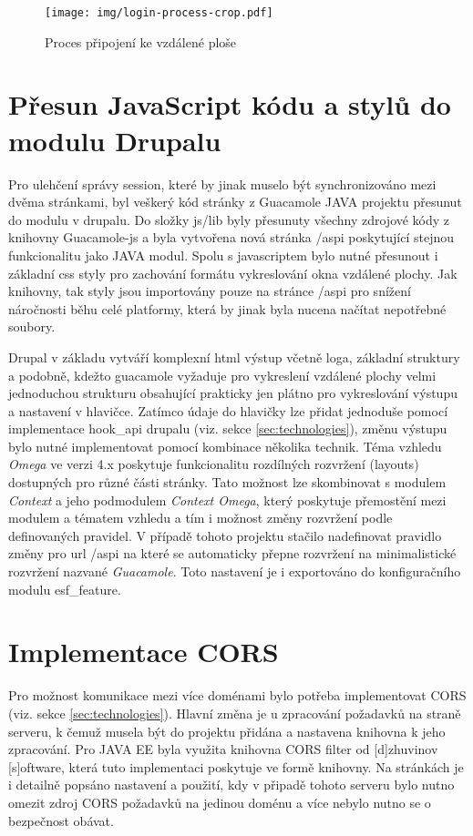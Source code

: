 \begin{figure}[]
  \texttt{[image: img/login-process-crop.pdf]}
  \caption{Proces připojení ke vzdálené ploše}
  \label{fig:login_process}
\end{figure}  

\section{Přesun JavaScript kódu a stylů do modulu Drupalu}
Pro ulehčení správy \gls{session}, které by jinak muselo být synchronizováno mezi dvěma stránkami, byl veškerý kód stránky z Guacamole JAVA projektu přesunut do modulu v drupalu. Do složky js/lib byly přesunuty všechny zdrojové kódy z knihovny Guacamole-js a byla vytvořena nová stránka /aspi poskytující stejnou funkcionalitu jako JAVA modul. Spolu s javascriptem bylo nutné přesunout i základní css styly pro zachování formátu vykreslování okna vzdálené plochy. Jak knihovny, tak styly jsou importovány pouze na stránce /aspi pro snížení náročnosti běhu celé platformy, která by jinak byla nucena načítat nepotřebné soubory. 

Drupal v základu vytváří komplexní html výstup včetně loga, základní struktury a podobně, kdežto guacamole vyžaduje pro vykreslení vzdálené plochy velmi jednoduchou strukturu obsahující prakticky jen plátno pro vykreslování výstupu a nastavení v hlavičce. Zatímco údaje do hlavičky lze přidat jednoduše pomocí implementace hook\_api drupalu (viz. sekce \ref{sec:technologies}), změnu výstupu bylo nutné implementovat pomocí kombinace několika technik. Téma vzhledu \emph{Omega} ve verzi 4.x poskytuje funkcionalitu rozdílných rozvržení (layouts) dostupných pro různé části stránky. Tato možnost lze skombinovat s modulem \emph{Context} a jeho podmodulem \emph{Context Omega}, který poskytuje přemostění mezi modulem a tématem vzhledu a tím i možnost změny rozvržení podle definovaných pravidel. V případě tohoto projektu stačilo nadefinovat pravidlo změny pro url /aspi na které se automaticky přepne rozvržení na minimalistické rozvržení nazvané \emph{Guacamole}. Toto nastavení je i exportováno do konfiguračního modulu esf\_feature.

\section{Implementace CORS}
Pro možnost komunikace mezi více doménami bylo potřeba implementovat CORS (viz. sekce \ref{sec:technologies}). Hlavní změna je u zpracování požadavků na straně serveru, k čemuž musela být do projektu přidána a nastavena knihovna k jeho zpracování. Pro JAVA EE byla využita knihovna CORS filter od [d]zhuvinov  [s]oftware\cite{website:cors-filter}, která tuto implementaci poskytuje ve formě knihovny. Na stránkách je i detailně popsáno nastavení a použití, kdy v připadě tohoto serveru bylo nutno omezit zdroj CORS požadavků na jedinou doménu a více nebylo nutno se o bezpečnost obávat.

